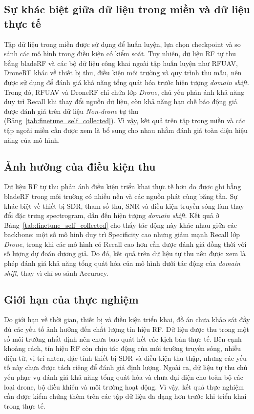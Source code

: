 \documentclass[../DoAn.tex]{subfiles}
\begin{document}
\subsection{Sự khác biệt giữa dữ liệu trong miền và dữ liệu thực tế}
Tập dữ liệu trong miền được sử dụng để huấn luyện, lựa chọn checkpoint và so sánh các mô hình trong điều kiện có kiểm soát. Tuy nhiên, dữ liệu RF tự thu bằng bladeRF và các bộ dữ liệu công khai ngoài tập huấn luyện như RFUAV, DroneRF khác về thiết bị thu, điều kiện môi trường và quy trình thu mẫu, nên được sử dụng để đánh giá khả năng tổng quát hóa trước hiện tượng \textit{domain shift}. Trong đó, RFUAV và DroneRF chỉ chứa lớp \textit{Drone}, chủ yếu phản ánh khả năng duy trì Recall khi thay đổi nguồn dữ liệu, còn khả năng hạn chế báo động giả được đánh giá trên dữ liệu \textit{Non-drone} tự thu (Bảng~\ref{tab:finetune_self_collected}). Vì vậy, kết quả trên tập trong miền và các tập ngoài miền cần được xem là bổ sung cho nhau nhằm đánh giá toàn diện hiệu năng của mô hình.

\subsection{Ảnh hưởng của điều kiện thu}
Dữ liệu RF tự thu phản ánh điều kiện triển khai thực tế hơn do được ghi bằng bladeRF trong môi trường có nhiễu nền và các nguồn phát cùng băng tần. Sự khác biệt về thiết bị SDR, tham số thu, SNR và điều kiện truyền sóng làm thay đổi đặc trưng spectrogram, dẫn đến hiện tượng \textit{domain shift}. Kết quả ở Bảng~\ref{tab:finetune_self_collected} cho thấy tác động này khác nhau giữa các backbone: một số mô hình duy trì Specificity cao nhưng giảm mạnh Recall lớp \textit{Drone}, trong khi các mô hình có Recall cao hơn cần được đánh giá đồng thời với số lượng dự đoán dương giả. Do đó, kết quả trên dữ liệu tự thu nên được xem là phép đánh giá khả năng tổng quát hóa của mô hình dưới tác động của \textit{domain shift}, thay vì chỉ so sánh Accuracy.

\subsection{Giới hạn của thực nghiệm}

Do giới hạn về thời gian, thiết bị và điều kiện triển khai, đồ án chưa khảo sát đầy đủ các yếu tố ảnh hưởng đến chất lượng tín hiệu RF. Dữ liệu được thu trong một số môi trường nhất định nên chưa bao quát hết các kịch bản thực tế. Bên cạnh khoảng cách, tín hiệu RF còn chịu tác động của môi trường truyền sóng, nhiễu điện từ, vị trí anten, đặc tính thiết bị SDR và điều kiện thu thập, nhưng các yếu tố này chưa được tách riêng để đánh giá định lượng. Ngoài ra, dữ liệu tự thu chủ yếu phục vụ đánh giá khả năng tổng quát hóa và chưa đại diện cho toàn bộ các loại drone, bộ điều khiển và môi trường hoạt động. Vì vậy, kết quả thực nghiệm cần được kiểm chứng thêm trên các tập dữ liệu đa dạng hơn trước khi triển khai trong thực tế.
\end{document}
